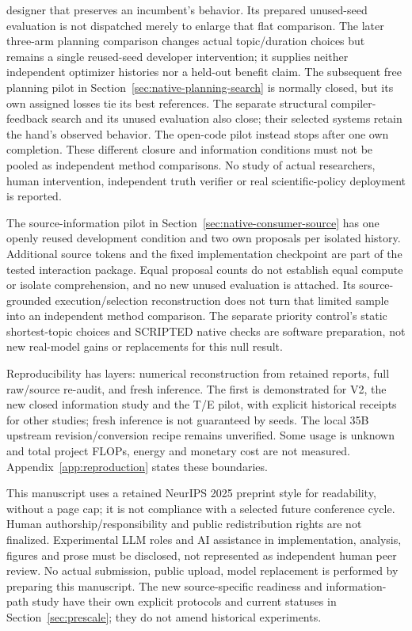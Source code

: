 designer that preserves an incumbent's behavior. Its prepared unused-seed
evaluation is not dispatched merely to enlarge that flat comparison.
The later three-arm planning comparison changes actual topic/duration choices
but remains a single reused-seed developer intervention; it supplies neither
independent optimizer histories nor a held-out benefit claim. The subsequent
free planning pilot in Section~\ref{sec:native-planning-search} is normally
closed, but its own assigned losses tie its best references. The separate
structural compiler-feedback search and its unused evaluation also close;
their selected systems retain the hand's observed behavior. The open-code
pilot instead stops after one own completion. These different closure and
information conditions must not be pooled as independent method comparisons.
No study of actual researchers, human intervention, independent truth verifier
or real scientific-policy deployment is reported.

The source-information pilot in Section~\ref{sec:native-consumer-source} has one
openly reused development condition and two own proposals per isolated history.
Additional source tokens and the fixed implementation checkpoint are part of
the tested interaction package. Equal proposal counts do not establish equal
compute or isolate comprehension, and no new unused evaluation is attached.
Its source-grounded execution/selection reconstruction does not turn that
limited sample into an independent method comparison. The separate priority
control's static shortest-topic choices and SCRIPTED native checks are software
preparation, not new real-model gains or replacements for this null result.

Reproducibility has layers: numerical reconstruction from retained reports,
full raw/source re-audit, and fresh inference. The first is demonstrated for
V2, the new closed information study and the T/E pilot, with explicit historical receipts
for other studies; fresh inference is not
guaranteed by seeds. The local 35B upstream revision/conversion recipe remains
unverified. Some usage is unknown and total project FLOPs, energy and monetary
cost are not measured. Appendix~\ref{app:reproduction} states these boundaries.

This manuscript uses a retained NeurIPS 2025 preprint style for readability,
without a page cap; it is not compliance with a selected future conference
cycle. Human authorship/responsibility and public redistribution rights are
not finalized. Experimental LLM roles and AI assistance in implementation,
analysis, figures and prose must be disclosed, not represented as independent
human peer review. No actual submission, public upload, model replacement
is performed by preparing this manuscript. The new source-specific readiness
and information-path study have their own explicit protocols and current
statuses in Section~\ref{sec:prescale}; they do not amend historical experiments.

